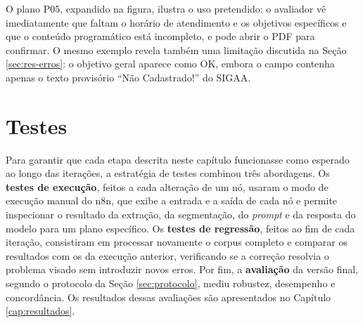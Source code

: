 O plano P05, expandido na figura, ilustra o uso pretendido: o avaliador vê imediatamente que faltam o horário de atendimento e os objetivos específicos e que o conteúdo programático está incompleto, e pode abrir o PDF para confirmar. O mesmo exemplo revela também uma limitação discutida na Seção \ref{sec:res-erros}: o objetivo geral aparece como OK, embora o campo contenha apenas o texto provisório ``Não Cadastrado!'' do SIGAA.

\section{Testes}
\label{sec:testes}

Para garantir que cada etapa descrita neste capítulo funcionasse como esperado ao longo das iterações, a estratégia de testes combinou três abordagens. Os \textbf{testes de execução}, feitos a cada alteração de um nó, usaram o modo de execução manual do n8n, que exibe a entrada e a saída de cada nó e permite inspecionar o resultado da extração, da segmentação, do \textit{prompt} e da resposta do modelo para um plano específico. Os \textbf{testes de regressão}, feitos ao fim de cada iteração, consistiram em processar novamente o corpus completo e comparar os resultados com os da execução anterior, verificando se a correção resolvia o problema visado sem introduzir novos erros. Por fim, a \textbf{avaliação} da versão final, segundo o protocolo da Seção \ref{sec:protocolo}, mediu robustez, desempenho e concordância. Os resultados dessas avaliações são apresentados no Capítulo \ref{cap:resultados}.
